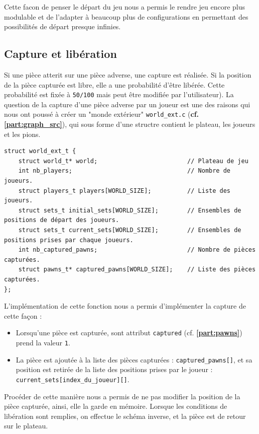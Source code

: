         Cette facon de penser le départ du jeu nous a permis le rendre jeu encore plus modulable et de l'adapter à beaucoup plus de configurations en permettant des possibilités de départ presque infinies.
            
    \subsection{Capture et libération}
        Si une pièce atterit sur une pièce adverse, une capture est réalisée. Si la position de la pièce capturée est libre, elle a une probabilité d'être libérée. Cette probabilité est fixée à \texttt{50/100} mais peut être modifiée par l'utilisateur).
        La question de la capture d'une pièce adverse par un joueur est une des raisons qui nous ont poussé à créer un "monde extérieur" \texttt{world\_ext.c} (\textbf{cf. \ref{part:graph_src}}), qui sous forme d'une structre contient le plateau, les joueurs et les pions.
        \begin{lstlisting}
struct world_ext_t {
	struct world_t* world;                         // Plateau de jeu
	int nb_players;                                // Nombre de joueurs.
	struct players_t players[WORLD_SIZE];          // Liste des joueurs.
	struct sets_t initial_sets[WORLD_SIZE];        // Ensembles de positions de départ des joueurs.
	struct sets_t current_sets[WORLD_SIZE];        // Ensembles de positions prises par chaque joueurs.
	int nb_captured_pawns;                         // Nombre de pièces capturées.
	struct pawns_t* captured_pawns[WORLD_SIZE];    // Liste des pièces capturées.
};\end{lstlisting}
        \noindent L'implémentation de cette fonction nous a permis d'implémenter la capture de cette façon :
        \begin{itemize}
            \item Lorsqu'une pièce est capturée, sont attribut \texttt{captured} (cf. \textbf{\ref{part:pawns}}) prend la valeur \texttt{1}.
            \item La pièce est ajoutée à la liste des pièces capturées : \texttt{captured\_pawns[]}, et sa position est retirée de la liste des positions prises par le joueur : \texttt{current\_sets[index\_du\_joueur][]}.
        \end{itemize}
        \medbreak
        Procéder de cette manière nous a permis de ne pas modifier la position de la pièce capturée, ainsi, elle la garde en mémoire. Lorsque les conditions de libération sont remplies, on effectue le schéma inverse, et la pièce est de retour sur le plateau. 

